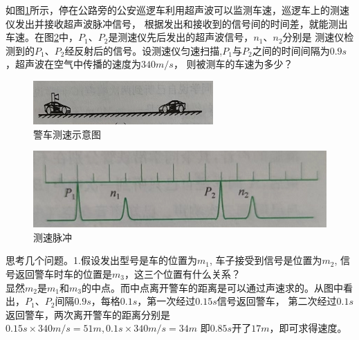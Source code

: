 \documentclass[windows,csize4, answers]{BHCexam}
\begin{document}
\begin{groups}
\begin{questions}[]
        \question[5] 如图\ref{fig:fig_2_7}所示，停在公路旁的公安巡逻车利用超声波可以监测车速，巡逻车上的测速仪发出并接收超声波脉冲信号，
        根据发出和接收到的信号间的时间差，就能测出车速。在图\ref{fig:fig_2_8}中，$P_1$、$P_2$是测速仪先后发出的超声波信号，$n_1$、$n_2$分别是
        测速仪检测到的$P_1$、$P_2$经反射后的信号。设测速仪匀速扫描,$P_1$与$P_2$之间的时间间隔为$0.9s$，超声波在空气中传播的速度为$340m/s$，
        则被测车的车速为多少？
        \begin{figure}[htb]
            \centering
            \includegraphics [scale=0.75,trim=0 0 0 0]{./image/fig_2_7.PNG}
            \caption{警车测速示意图}
            \label{fig:fig_2_7}
        \end{figure}
        \begin{figure}[htb]
            \centering
            \includegraphics [scale=0.75,trim=0 0 0 0]{./image/fig_2_8.PNG}
            \caption{测速脉冲}
            \label{fig:fig_2_8}
        \end{figure}
        \begin{solution}{0.5cm}
            \methodonly 思考几个问题。1.假设发出型号是车的位置为$m_1$, 车子接受到信号是位置为$m_2$, 信号返回警车时车的位置是$m_3$，这三个位置有什么关系？\\
            显然$m_2$是$m_1$和$m_3$的中点。而中点离开警车的距离是可以通过声速求的。从图中看出，$P_1$、$P_2$间隔$0.9s$，每格$0.1s$，第一次经过$0.15s$信号返回警车，
            第二次经过$0.1s$返回警车，两次离开警车的距离分别是$0.15s\times 340m/s=51m,0.1s\times 340m/s=34m$ 即$0.85s$开了$17m$，即可求得速度。
        \end{solution}


\end{questions}
\end{groups}
\end{document}
